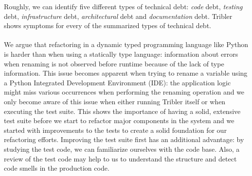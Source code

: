 \noindent Roughly, we can identify five different types of technical debt\cite{seaman2011measuring}: \emph{code} debt, \emph{testing} debt, \emph{infrastructure} debt, \emph{architectural} debt and \emph{documentation} debt. Tribler shows symptoms for every of the summarized types of technical debt.\\\\
We argue that refactoring in a dynamic typed programming language like Python is harder than when using a statically type language: information about errors when renaming is not observed before runtime because of the lack of type information. This issue becomes apparent when trying to rename a variable using a Python Integrated Development Environment (IDE): the application logic might miss various occurrences when performing the renaming operation and we only become aware of this issue when either running Tribler itself or when executing the test suite. This shows the importance of having a solid, extensive test suite before we start to refactor major components in the system and we started with improvements to the tests to create a solid foundation for our refactoring efforts. Improving the test suite first has an additional advantage: by studying the test code, we can familiarize ourselves with the code base. Also, a review of the test code may help to us to understand the structure and detect code smells in the production code\cite{van2002video}.

